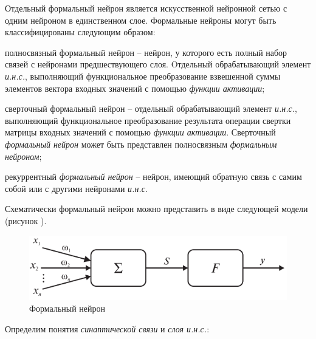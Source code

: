Отдельный формальный нейрон является искусственной нейронной сетью с одним нейроном в единственном слое.
Формальные нейроны могут быть классифицированы следующим образом:
\begin{textitemize}
	\item полносвязный формальный нейрон -- нейрон, у которого есть полный набор связей с нейронами предшествующего слоя. Oтдельный обрабатывающий элемент \textit{и.н.с.}, выполняющий функциональное преобразование взвешенной суммы элементов вектора входных значений с помощью \textit{функции активации};
	\item сверточный формальный нейрон -- отдельный обрабатывающий элемент \textit{и.н.с.}, выполняющий функциональное преобразование результата операции свертки матрицы входных значений с помощью \textit{функции активации}. Сверточный \textit{формальный нейрон} может быть представлен полносвязным \textit{формальным нейроном};
	\item рекуррентный \textit{формальный нейрон} -- нейрон, имеющий обратную связь с самим собой или с другими нейронами \textit{и.н.с.}
\end{textitemize}

Схематически формальный нейрон можно представить в виде следующей модели (рисунок \textit{}).

\begin{figure}[H]
	\centering
	\includegraphics[scale=0.4]{author/part3/figures/formal_neuron.png}
	\caption{Формальный нейрон}
	\label{fig:formal_neuron}
\end{figure}

Определим понятия \textit{синаптической связи} и \textit{слоя и.н.с.}:

\begin{SCn}

\end{SCn}


